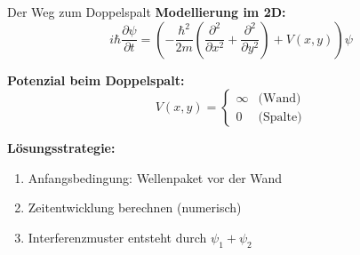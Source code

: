 
\begin{frame}{Der Weg zum Doppelspalt}
    \textbf{Modellierung im 2D:}
    \[
        i\hbar\frac{\partial \psi}{\partial t} = \left(-\frac{\hbar^2}{2m}(\frac{\partial^2}{\partial x^2} + \frac{\partial^2}{\partial y^2}) + V(x,y)\right)\psi
    \]

    \textbf{Potenzial beim Doppelspalt:}
    \[
        V(x,y) = \begin{cases}
                     \infty & \text{(Wand)} \\
                     0 & \text{(Spalte)}
        \end{cases}
    \]

    \textbf{Lösungsstrategie:}
    \begin{enumerate}
        \item Anfangsbedingung: Wellenpaket vor der Wand
        \item Zeitentwicklung berechnen (numerisch)
        \item Interferenzmuster entsteht durch $\psi_1 + \psi_2$
    \end{enumerate}
\end{frame}